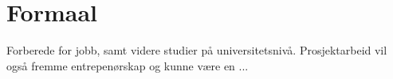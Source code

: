 \section*{Formaal} \label{Sec: Formaal}


	Forberede for jobb, samt videre studier på universitetsnivå. Prosjektarbeid vil også fremme entrepenørskap og kunne være en ...
